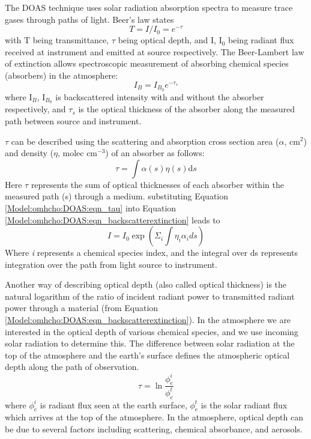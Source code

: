     The DOAS technique uses solar radiation absorption spectra to measure trace gases through paths of light.
    Beer's law states
    \begin{equation} \label{Model:omhcho:DOAS:eqn_beerslaw}
    T = I/I_0 = e^{-\tau}
    \end{equation}
    with T being transmittance, $\tau$ being optical depth, and I, I$_0$ being radiant flux received at instrument and emitted at source respectively.
    The Beer-Lambert law of extinction allows spectroscopic measurement of absorbing chemical species (absorbers) in the atmosphere:
    \begin{equation} \label{Model:omhcho:DOAS:eqn_backscatterextinction}
    I_B = I_{B_0} e^{-\tau_s}
    \end{equation}
    where I$_B$, I$_{B_0}$ is backscattered intensity with and without the absorber respectively, and $\tau_s$ is the optical thickness of the absorber along the measured path between source and instrument.
    
    $\tau$ can be described using the scattering and absorption cross section area ($\alpha$, cm$^{2}$) and density ($\eta$, molec cm$^{-3}$) of an absorber as follows:
    \begin{equation} \label{Model:omhcho:DOAS:eqn_tau}
    \tau = \int \alpha(s) \eta(s) \mathrm{d}s
    \end{equation}
    Here $\tau$ represents the sum of optical thicknesses of each absorber within the measured path (s) through a medium.
    substituting Equation \ref{Model:omhcho:DOAS:eqn_tau} into Equation \ref{Model:omhcho:DOAS:eqn_backscatterextinction} leads to
    \begin{equation}
      I = I_0 \exp { \left( \Sigma_i \int \eta_i \alpha_i ds \right) }
    \end{equation}
    Where \textit{i} represents a chemical species index, and the integral over ds represents integration over the path from light source to instrument.
    
    Another way of describing optical depth (also called optical thickness) is the natural logarithm of the ratio of incident radiant power to transmitted radiant power through a material (from Equation \ref{Model:omhcho:DOAS:eqn_backscatterextinction}).
    In the atmosphere we are interested in the optical depth of various chemical species, and we use incoming solar radiation to determine this.
    The difference between solar radiation at the top of the atmosphere and the earth's surface defines the atmospheric optical depth along the path of observation.
    \begin{equation}
      \tau = \ln{\frac{\phi_e^i}{\phi_e^t}}
    \end{equation}
    where $\phi_e^i$ is radiant flux seen at the earth surface, $\phi_e^t$ is the solar radiant flux which arrives at the top of the atmosphere.
    In the atmosphere, optical depth can be due to several factors including scattering, chemical absorbance, and aerosols.
  
